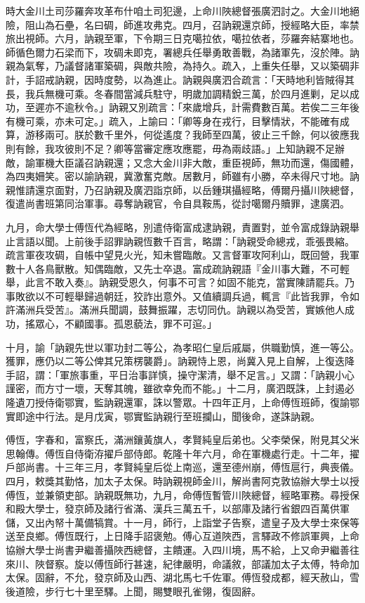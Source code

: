 \begin{pinyinscope}
時大金川土司莎羅奔攻革布什咱土司犯邊，上命川陜總督張廣泗討之。大金川地絕險，阻山為石壘，名曰碉，師進攻弗克。四月，召訥親還京師，授經略大臣，率禁旅出視師。六月，訥親至軍，下令期三日克噶拉依，噶拉依者，莎羅奔結寨地也。師循色爾力石梁而下，攻碉未即克，署總兵任舉勇敢善戰，為諸軍先，沒於陣。訥親為氣奪，乃議督諸軍築碉，與敵共險，為持久。疏入，上重失任舉，又以築碉非計，手詔戒訥親，因時度勢，以為進止。訥親與廣泗合疏言：「天時地利皆賊得其長，我兵無機可乘。冬春間當減兵駐守，明歲加調精銳三萬，於四月進剿，足以成功，至遲亦不逾秋令。」訥親又別疏言：「來歲增兵，計需費數百萬。若俟二三年後有機可乘，亦未可定。」疏入，上諭曰：「卿等身在戎行，目擊情狀，不能確有成算，游移兩可。朕於數千里外，何從遙度？我師至四萬，彼止三千餘，何以彼應我則有餘，我攻彼則不足？卿等當審定應攻應罷，毋為兩歧語。」上知訥親不足辦敵，諭軍機大臣議召訥親還；又念大金川非大敵，重臣視師，無功而還，傷國體，為四夷姍笑。密以諭訥親，冀激奮克敵。居數月，師雖有小勝，卒未得尺寸地。訥親惟請還京面對，乃召訥親及廣泗詣京師，以岳鍾琪攝經略，傅爾丹攝川陜總督，復遣尚書班第同治軍事。尋奪訥親官，令自具鞍馬，從討噶爾丹贖罪，逮廣泗。

九月，命大學士傅恆代為經略，別遣侍衛富成逮訥親，責置對，並令富成錄訥親舉止言語以聞。上前後手詔罪訥親恆數千百言，略謂：「訥親受命總戎，乖張畏縮。疏言軍夜攻碉，自帳中望見火光，知未嘗臨敵。又言督軍攻阿利山，既回營，我軍數十人各鳥獸散。知偶臨敵，又先士卒退。富成疏訥親語『金川事大難，不可輕舉，此言不敢入奏』。訥親受恩久，何事不可言？如固不能克，當實陳請罷兵。乃事敗欲以不可輕舉歸過朝廷，狡詐出意外。又值續調兵過，輒言『此皆我罪，令如許滿洲兵受苦』。滿洲兵聞調，鼓舞振躍，志切同仇。訥親以為受苦，實嫉他人成功，搖眾心，不顧國事。孤恩藐法，罪不可逭。」

十月，諭「訥親先世以軍功封二等公，為孝昭仁皇后戚屬，供職勤慎，進一等公。獲罪，應仍以二等公俾其兄策楞襲爵」。訥親恃上恩，尚冀入見上自解，上復迭降手詔，謂：「軍旅事重，平日治事詳慎，操守潔清，舉不足言。」又謂：「訥親小心謹密，而方寸一壞，天奪其魄，雖欲幸免而不能。」十二月，廣泗既誅，上封遏必隆遺刀授侍衛鄂實，監訥親還軍，誅以警眾。十四年正月，上命傅恆班師，復諭鄂實即途中行法。是月戊寅，鄂實監訥親行至班攔山，聞後命，遂誅訥親。

傅恆，字春和，富察氏，滿洲鑲黃旗人，孝賢純皇后弟也。父李榮保，附見其父米思翰傳。傅恆自侍衛洊擢戶部侍郎。乾隆十年六月，命在軍機處行走。十二年，擢戶部尚書。十三年三月，孝賢純皇后從上南巡，還至德州崩，傅恆扈行，典喪儀。四月，敕獎其勤恪，加太子太保。時訥親視師金川，解尚書阿克敦協辦大學士以授傅恆，並兼領吏部。訥親既無功，九月，命傅恆暫管川陜總督，經略軍務。尋授保和殿大學士，發京師及諸行省滿、漢兵三萬五千，以部庫及諸行省銀四百萬供軍儲，又出內帑十萬備犒賞。十一月，師行，上詣堂子告察，遣皇子及大學士來保等送至良鄉。傅恆既行，上日降手詔褒勉。傅心互道陜西，言驛政不修誤軍興，上命協辦大學士尚書尹繼善攝陜西總督，主饋運。入四川境，馬不給，上又命尹繼善往來川、陜督察。旋以傅恆師行甚速，紀律嚴明，命議敘，部議加太子太傅，特命加太保。固辭，不允，發京師及山西、湖北馬七千佐軍。傅恆發成都，經天赦山，雪後道險，步行七十里至驛。上聞，賜雙眼孔雀翎，復固辭。


\end{pinyinscope}
